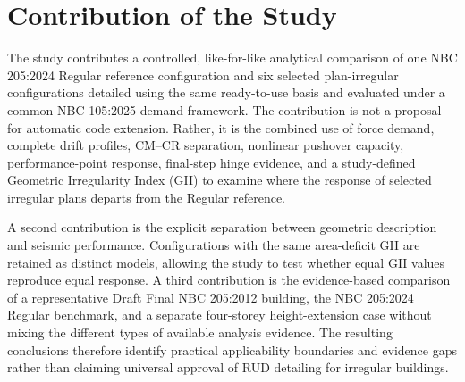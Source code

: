
\section{Contribution of the Study}
The study contributes a controlled, like-for-like analytical comparison of one NBC 205:2024 Regular reference configuration and six selected plan-irregular configurations detailed using the same ready-to-use basis and evaluated under a common NBC 105:2025 demand framework. The contribution is not a proposal for automatic code extension. Rather, it is the combined use of force demand, complete drift profiles, CM--CR separation, nonlinear pushover capacity, performance-point response, final-step hinge evidence, and a study-defined Geometric Irregularity Index (GII) to examine where the response of selected irregular plans departs from the Regular reference.

A second contribution is the explicit separation between geometric description and seismic performance. Configurations with the same area-deficit GII are retained as distinct models, allowing the study to test whether equal GII values reproduce equal response. A third contribution is the evidence-based comparison of a representative Draft Final NBC 205:2012 building, the NBC 205:2024 Regular benchmark, and a separate four-storey height-extension case without mixing the different types of available analysis evidence. The resulting conclusions therefore identify practical applicability boundaries and evidence gaps rather than claiming universal approval of RUD detailing for irregular buildings.
